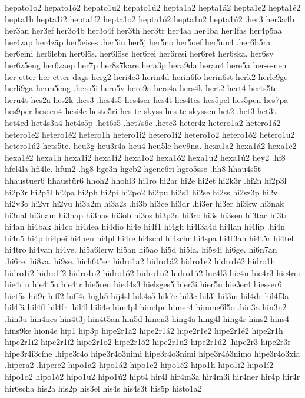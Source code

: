 hepato1o2
hepato1ó2
hepato1u2
hepato1ú2
hepta1a2
hepta1á2
hepta1e2
hepta1é2
hepta1h
hepta1i2
hepta1í2
hepta1o2
hepta1ó2
hepta1u2
hepta1ú2
.her3
her3a4b
her3an
her3ef
her3o4b
her3o4f
her3th
her3tr
her4aa
her4ba
her4fas
her4p5aa
her4zap
her4zäp
her5eises
.her5in
her5j
her5no
her5oef
her5un4
.her6b5ra
her6eini
her6lebn
her6lös.
her6löse
her6rei
her6resi
her6ret
her6ska.
her6sv
her6z5eng
her6zaep
her7p
her8s7kare
hera3p
hera9da
herau4
here5a
her-e-nen
her-etter
her-etter-dags
herg2
heri4e3
herin4d
herin6fo
herin6st
herk2
herle9ge
herli9ga
herm5eng
.hero5i
hero5v
hero9a
hers4a
hers4k
hert2
hert4
herts5te
heru4t
hes2a
hes2k
.hes3
.hes4s5
hes4ser
hes4t
hes4tes
hes5pel
hes5pen
hes7pa
hes9per
heseen4
hesi4e
heste5ri
hes-te-skyss
hes-te-skyssen
het2
.het3
het3t
het4ed
het4s3a4
het4s5p
.het6s5
.het7s6e
.hete3
heter4z
hetero1a2
hetero1á2
hetero1e2
hetero1é2
hetero1h
hetero1i2
hetero1í2
hetero1o2
hetero1ó2
hetero1u2
hetero1ú2
hets5te.
heu3g
heu3r4a
heu4
heu5le
hev9na.
hexa1a2
hexa1á2
hexa1e2
hexa1é2
hexa1h
hexa1i2
hexa1í2
hexa1o2
hexa1ó2
hexa1u2
hexa1ú2
hey2
.hf8
hfel4la
hfi4le.
hfun2
.hg8
hge3n
hgeb2
hgene6ri
hgro5sse
.hh8
hhau4s5t
hhaustuer6
hhaustür6
hhoh2
hhohl3
hi1ro
hi2ar
hi2e
hi2et
hi2k3r
.hi2n
hi2p3l
hi2p3r
hi2p5l
hi2pa
hi2ph
hi2pi
hi2po2
hi2pu
hi2s1
hi2se
hi2ss
hi2sz3p
hi2v
hi2v3o
hi2vr
hi2vu
hi3a2m
hi3a2s
.hi3b
hi3ce
hi3dr
.hi3er
hi3er
hi3kw
hi3nak
hi3nal
hi3nam
hi3nap
hi3nas
hi3ob
hi3os
hi3p2n
hi3ro
hi3s
hi3sen
hi3tac
hi3tr
hi4an
hi4bak
hi4co
hi4dea
hi4dio
hi4e
hi4f1
hi4gh
hi4l3a4d
hi4lan
hi4lip
.hi4n
hi4n5
hi4p
hi4pei
hi4pen
hi4pl
hi4re
hi4schl
hi4schr
hi4spa
hi4t3an
hi4t5r
hi4tel
hi4tro
hi4van
hi4ve.
hi5a6lerw
hi5an
hi5ao
hi5d
hi5la.
hi5s4i
hi6ge.
hi6n7an
.hi6re.
hi8va.
hi9se.
hich6t5er
hidro1a2
hidro1á2
hidro1e2
hidro1é2
hidro1h
hidro1i2
hidro1í2
hidro1o2
hidro1ó2
hidro1u2
hidro1ú2
hie4f3
hie4n
hie4r3
hie4rei
hie4rin
hie4t5o
hie4tr
hie5ren
hied4s3
hielsges5
hier3i
hier5u
hießer4
hiesser6
hiet5s
hif9r
hiff2
hiff4r
high5
hij4sl
hik4s5
hik7e
hil3c
hil3l
hil3m
hil4dr
hil4f3a
hil4fä
hil4fl
hil4fr
.hil4l
hili4e
him4pl
him4pr
himer4
himme6l5o
.hin3a
hin3n2
.hin3u
hin4nes
hin4t3j
hin4t5an
hin5d
hinen3
hing4a
hing4l
hing4r
hins2
hins4
hins9ke
hion4e
hip1
hip3p
hipe2r1a2
hipe2r1á2
hipe2r1e2
hipe2r1é2
hipe2r1h
hipe2r1i2
hipe2r1í2
hipe2r1o2
hipe2r1ó2
hipe2r1u2
hipe2r1ú2
.hipe2r3
hipe2r3r
hipe3r4i3cíne
.hipe3r4o
hipe3r4o3nimi
hipe3r4o3ními
hipe3r4ó3nimo
hipe3r4o3xia
.hipera2
.hipere2
hipo1a2
hipo1á2
hipo1e2
hipo1é2
hipo1h
hipo1i2
hipo1í2
hipo1o2
hipo1ó2
hipo1u2
hipo1ú2
hipt4
hir4l
hir4m3a
hir4m3i
hir4ner
hir4p
hir4r
hir6scha
his2a
his2p
his3el
his4s
his4s3t
his5p
histo1a2
